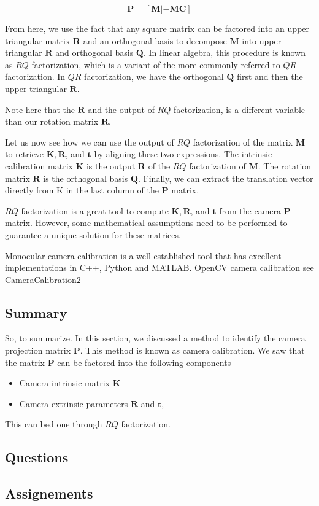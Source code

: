 \begin{equation}
\mathbf{P} = [\mathbf{M} | - \mathbf{MC}]
\end{equation}

From here, we use the fact that any square matrix can be factored into an upper
triangular matrix $\mathbf{R}$ and an orthogonal basis
to decompose $\mathbf{M}$ into upper triangular $\mathbf{R}$ and orthogonal basis $\mathbf{Q}$. 
In linear algebra, this procedure is known as $RQ$ factorization, which is a variant
of the more commonly referred to $QR$ factorization. In $QR$ factorization, we have the orthogonal $\mathbf{Q}$
first and then the upper triangular $\mathbf{R}$. 

\begin{framed}
\begin{remark}
Note here that the $\mathbf{R}$ and the output
of $RQ$ factorization, is a different variable than our rotation matrix $\mathbf{R}$. 
\end{remark}
\end{framed}


Let us now see how we can use the output of $RQ$ factorization of
the matrix $\mathbf{M}$ to retrieve $\mathbf{K}, \mathbf{R}$, and $\mathbf{t}$ by aligning
these two expressions. The intrinsic calibration matrix
$\mathbf{K}$ is the output $\mathbf{R}$ of the $RQ$ factorization of $\mathbf{M}$. 
The rotation matrix $\mathbf{R}$ is the orthogonal basis $\mathbf{Q}$. 
Finally, we can extract the translation vector directly from K in the last column of the $\mathbf{P}$ matrix. 

$RQ$ factorization is a great tool to compute $\mathbf{K}, \mathbf{R}$, and $\mathbf{t}$ from
the camera $\mathbf{P}$ matrix. However, some mathematical assumptions need to be performed to guarantee a unique solution
for these matrices. 


Monocular camera calibration is a well-established tool that has excellent implementations
in C++, Python and MATLAB. OpenCV camera calibration see \url{CameraCalibration2} 

\subsection{Summary}

So, to summarize. In this section, we discussed a method to identify the camera projection
matrix $\mathbf{P}$. This method is known as camera calibration.
We saw  that the matrix $\mathbf{P}$ can be factored into the following components

\begin{itemize}
\item Camera intrinsic matrix $\mathbf{K}$ 
\item Camera extrinsic parameters $\mathbf{R}$ and $\mathbf{t}$, 
\end{itemize}
This can bed one  through $RQ$ factorization. 

\subsection{Questions}

\subsection{Assignements}
